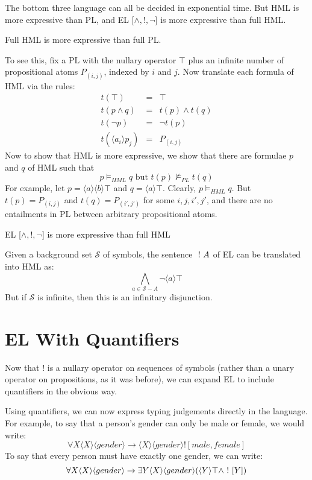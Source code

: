 The bottom three language can all be decided in exponential time.
But HML is more expressive than PL, and EL [$\land, !, \neg$]  is more expressive than full HML. 
\begin{proposition}
Full HML  is more expressive than full PL.
\end{proposition}
To see this, fix a PL with the nullary operator $\top$ plus an infinite number of propositional atoms $P_{(i,j)}$, indexed by $i$ and $j$.
Now translate each formula of HML via the rules:
\begin{eqnarray}
t(\top)  & = & \top \nonumber \\
t(p \land q) & = & t(p) \land t(q) \nonumber \\
t(\neg p) & = & \neg t(p)  \nonumber \\
t(\langle a_i \rangle p_j) & = & P_{(i,j)} \nonumber
\end{eqnarray}
Now to show that HML is more expressive, we show that there are formulae $p$ and $q$ of HML such that
\[
p \models_{HML} q \mbox{ but } t(p) \nvDash_{PL} t(q)
\]
For example, let $p = \langle a \rangle \langle b \rangle \top$ and $q = \langle a \rangle \top$.
Clearly, $p \models_{HML} q$. But $t(p) = P_{(i,j)}$ and $t(q) = P_{(i',j')}$ for some $i,j,i',j'$, and there are no entailments in PL between arbitrary propositional atoms.

\begin{proposition}
EL [$\land, !, \neg$]  is more expressive than full HML
\end{proposition}
Given a background set $\mathcal{S}$ of symbols, the sentence $\ ! \  A$ of EL can be translated into HML as:
\[
\bigwedge_{a \in \mathcal{S} - A} \neg \langle a \rangle \top
\]
But if $\mathcal{S}$ is infinite, then this is an infinitary disjunction.

\section{EL With Quantifiers}
Now that $!$ is a nullary operator on sequences of symbols (rather than a unary operator on propositions, as it was before), we can expand EL to include quantifiers in the obvious way.

Using quantifiers, we can now express typing judgements directly in the language. For example, to say that a person's gender can only be male or female, we would write:
\[
\forall X \langle X \rangle \langle gender \rangle \rightarrow \langle X \rangle \langle gender \rangle ![male, female]
\]
To say that every person must have exactly one gender, we can write:
\[
\forall X  \langle X \rangle \langle gender \rangle \rightarrow \exists Y \langle X \rangle \langle gender \rangle (\langle Y \rangle \top \land \ ! \  [Y])
\]


